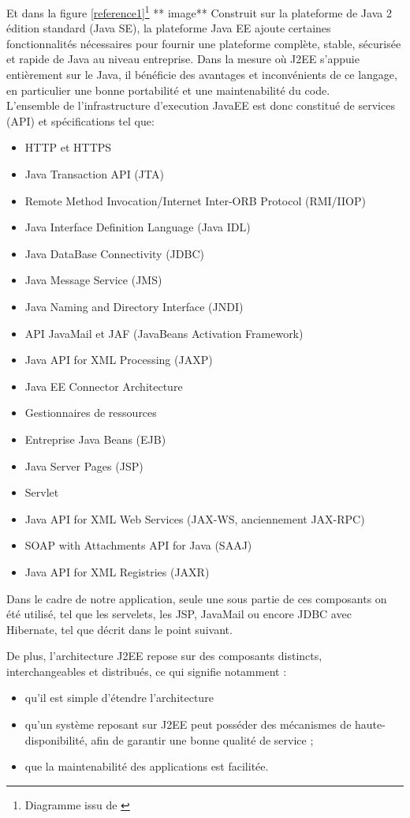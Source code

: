 Et dans la figure  \ref{reference1}\footnote{Diagramme issu de \url{}}
** image**
Construit sur la plateforme de Java 2 édition standard (Java SE), la plateforme Java EE ajoute certaines fonctionnalités nécessaires pour fournir une plateforme complète, stable, sécurisée et rapide de Java au niveau entreprise. 
Dans la mesure où J2EE s'appuie entièrement sur le Java, il bénéficie des avantages et inconvénients de ce langage, en particulier une bonne portabilité et une maintenabilité du code.\\
\newline
\indent
L'ensemble de l'infrastructure d'execution JavaEE est donc constitué de services (API) et spécifications tel que:
\begin{itemize}
\item HTTP et HTTPS
\item Java Transaction API (JTA)
\item Remote Method Invocation/Internet Inter-ORB Protocol (RMI/IIOP)
\item Java Interface Definition Language (Java IDL)
\item Java DataBase Connectivity (JDBC)
\item Java Message Service (JMS)
\item Java Naming and Directory Interface (JNDI)
\item API JavaMail et JAF (JavaBeans Activation Framework)
\item Java API for XML Processing (JAXP)
\item Java EE Connector Architecture
\item Gestionnaires de ressources
\item Entreprise Java Beans (EJB)
\item Java Server Pages (JSP)
\item Servlet
\item Java API for XML Web Services (JAX-WS, anciennement JAX-RPC)
\item SOAP with Attachments API for Java (SAAJ)
\item Java API for XML Registries (JAXR)
\end{itemize}
Dans le cadre de notre application, seule une sous partie de ces composants on été utilisé, tel que les servelets, les JSP, JavaMail ou encore JDBC avec Hibernate, tel que décrit dans le point suivant.

De plus, l'architecture J2EE repose sur des composants distincts, interchangeables et distribués, ce qui signifie notamment :
\begin{itemize}
\item qu'il est simple d'étendre l'architecture 
\item qu'un système reposant sur J2EE peut posséder des mécanismes de haute-disponibilité, afin de garantir une bonne qualité de service ;
\item que la maintenabilité des applications est facilitée.
\end{itemize}

